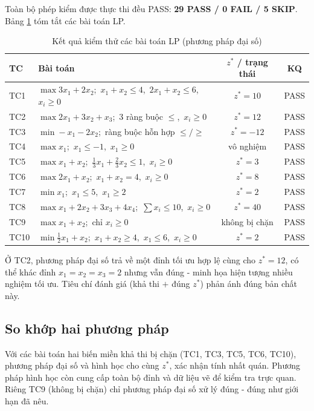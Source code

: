 \documentclass[12pt,a4paper]{article}
\theoremstyle{definition}
\begin{document}
Toàn bộ phép kiểm được thực thi đều PASS: \textbf{29 PASS / 0 FAIL / 5 SKIP}.
Bảng \ref{tab:results} tóm tắt các bài toán LP.

\begin{table}[H]
\centering
\caption{Kết quả kiểm thử các bài toán LP (phương pháp đại số)}
\label{tab:results}
\small
\begin{tabularx}{\textwidth}{lXcc}
\toprule
\textbf{TC} & \textbf{Bài toán} & \textbf{$z^\ast$ / trạng thái} & \textbf{KQ} \\
\midrule
TC1 & $\max 3x_1{+}2x_2$;\ $x_1{+}x_2\le4$,\ $2x_1{+}x_2\le6$,\ $x_i\ge0$ & $z^\ast = 10$ & PASS \\
TC2 & $\max 2x_1{+}3x_2{+}x_3$;\ 3 ràng buộc $\le$,\ $x_i\ge0$ & $z^\ast = 12$ & PASS \\
TC3 & $\min -x_1{-}2x_2$;\ ràng buộc hỗn hợp $\le/\ge$ & $z^\ast = -12$ & PASS \\
TC4 & $\max x_1$;\ $x_1\le-1$,\ $x_1\ge0$ & vô nghiệm & PASS \\
TC5 & $\max x_1{+}x_2$;\ $\tfrac13 x_1{+}\tfrac23 x_2\le1$,\ $x_i\ge0$ & $z^\ast = 3$ & PASS \\
TC6 & $\max 2x_1{+}x_2$;\ $x_1{+}x_2=4$,\ $x_i\ge0$ & $z^\ast = 8$ & PASS \\
TC7 & $\min x_1$;\ $x_1\le5$,\ $x_1\ge2$ & $z^\ast = 2$ & PASS \\
TC8 & $\max x_1{+}2x_2{+}3x_3{+}4x_4$;\ $\sum x_i\le10$,\ $x_i\ge0$ & $z^\ast = 40$ & PASS \\
TC9 & $\max x_1{+}x_2$;\ chỉ $x_i\ge0$ & không bị chặn & PASS \\
TC10 & $\min \tfrac12 x_1{+}x_2$;\ $x_1{+}x_2\ge4$,\ $x_1\le6$,\ $x_i\ge0$ & $z^\ast = 2$ & PASS \\
\bottomrule
\end{tabularx}
\end{table}

\begin{infobox}
Ở TC2, phương pháp đại số trả về một đỉnh tối ưu hợp lệ cùng cho $z^\ast = 12$,
có thể khác đỉnh $x_1{=}x_2{=}x_3{=}2$ nhưng vẫn đúng - minh họa hiện tượng
nhiều nghiệm tối ưu. Tiêu chí đánh giá (khả thi $+$ đúng $z^\ast$) phản ánh
đúng bản chất này.
\end{infobox}

\subsection{So khớp hai phương pháp}

Với các bài toán hai biến miền khả thi bị chặn (TC1, TC3, TC5, TC6, TC10), phương pháp đại
số và hình học cho cùng $z^\ast$, xác nhận tính nhất quán. Phương pháp hình học
còn cung cấp toàn bộ đỉnh và dữ liệu vẽ để kiểm tra trực quan. Riêng TC9 (không
bị chặn) chỉ phương pháp đại số xử lý đúng - đúng như giới hạn đã nêu.
\end{document}
